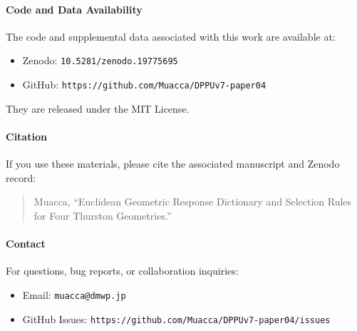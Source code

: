 \documentclass[12pt,a4paper]{article}
\theoremstyle{definition}
\theoremstyle{remark}
\begin{document}
\paragraph{Code and Data Availability}
The code and supplemental data associated with this work are available at:

\begin{itemize}
  \item Zenodo: \texttt{10.5281/zenodo.19775695}
  \item GitHub: \texttt{https://github.com/Muacca/DPPUv7-paper04}
\end{itemize}

They are released under the MIT License.

\paragraph{Citation}
If you use these materials, please cite the associated manuscript and Zenodo record:

\begin{quote}
\small
Muacca, ``Euclidean Geometric Response Dictionary and Selection Rules for Four
Thurston Geometries.''
\end{quote}

\paragraph{Contact}
For questions, bug reports, or collaboration inquiries:

\begin{itemize}
  \item Email: \texttt{muacca@dmwp.jp}
  \item GitHub Issues: \texttt{https://github.com/Muacca/DPPUv7-paper04/issues}
\end{itemize}

\appendix


\end{document}

